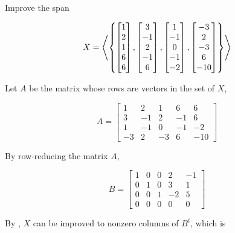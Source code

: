 \documentclass[a4paper,12pt]{article}
\begin{document}
\begin{exm}
  Improve the span

  $$X=\left\langle \left\{ \begin{bmatrix}
    1\\
    2\\
    1\\
    6\\
    6
  \end{bmatrix},\begin{bmatrix}
    3\\
    -1\\
    2\\
    -1\\
    6
  \end{bmatrix},\begin{bmatrix}
    1\\
    -1\\
    0\\
    -1\\
    -2
  \end{bmatrix},\begin{bmatrix}
    -3\\
    2\\
    -3\\
    6\\
    -10
  \end{bmatrix}\right\}\right\rangle$$\s

  \ans Let $A$ be the matrix whose rows are vectors in the set of $X$,

  $$A=\begin{bmatrix}
    1 & 2 & 1 & 6 & 6\\
    3 & -1 & 2 & -1 & 6\\
    1 & -1 & 0 & -1 & -2\\
    -3 & 2 & -3 & 6 & -10
  \end{bmatrix}$$\s

  By row-reducing the matrix $A$,

  $$B=\begin{bmatrix}
    1 & 0 & 0 & 2 & -1\\
    0 & 1 & 0 & 3 & 1\\
    0 & 0 & 1 & -2 & 5\\
    0 & 0 & 0 & 0 & 0
  \end{bmatrix}$$\s

  By \rthm[\sctd{1}], $X$ can be improved to nonzero columns of $B^{t}$, which is


\end{exm}
\end{document}
